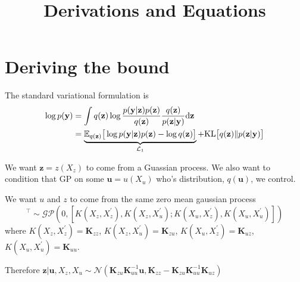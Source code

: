 \documentclass[12pt]{article}
\title{\textbf{Derivations and Equations}}
\date{}
\newcommand{\ub}{\mathbf{u}}
\newcommand{\zb}{\mathbf{z}}
\newcommand{\yb}{\mathbf{y}}
\newcommand{\dd}{\mathrm{d}}
\newcommand{\Lo}{\mathcal{L}_1}
\newcommand{\Kzz}{\mathbf{K}_{zz}}
\newcommand{\Kuu}{\mathbf{K}_{uu}}
\newcommand{\Kuz}{\mathbf{K}_{uz}}
\newcommand{\Kzu}{\mathbf{K}_{zu}}
\begin{document}
\maketitle


\section{Deriving the bound} %
\label{sec:derive_bound}
The standard variational formulation is
%
\begin{align}
    \log p(\yb) &= \int q(\zb)\log\frac{p(\yb|\zb)p(\zb)}{q(\zb)}\frac{q(\zb)}{p(\zb|\yb)} \dd\zb\notag\\
    &= \underbrace{\mathbb{E}_{q(\zb)}\big[ \log p(\yb|\zb)p(\zb) - \log q(\zb) \big]}_{\Lo} + \text{KL}\big[ q(\zb)\Vert p(\zb|\yb) \big]\label{eq:logpy1}
\end{align}

We want $\zb = z(X_z)$ to come from a Guassian process. We also want to condition that GP on some $\ub=u(X_u)$ who's distribution, $q(\ub)$, we control.

We want $u$ and $z$ to come from the same zero mean gaussian process
%
\begin{equation}
    [z(X_z),u(X_u)]^\top \sim \mathcal{GP}(0,[K(X_z,X_z^\prime),K(X_z,X_u^\prime);K(X_u,X_z^\prime),K(X_u,X_u^\prime)])
\end{equation}
%
where $K(X_z,X_z^\prime) = \Kzz$, $K(X_z,X_u^\prime) = \Kzu$, $ K(X_u,X_z^\prime) = \Kuz$, $K(X_u,X_u^\prime) = \Kuu$.

Therefore $\zb|\ub,X_z,X_u \sim \mathcal{N}(\Kzu\Kuu^{-1}\ub, \Kzz - \Kzu\Kuu^{-1}\Kuz)$
\end{document}
